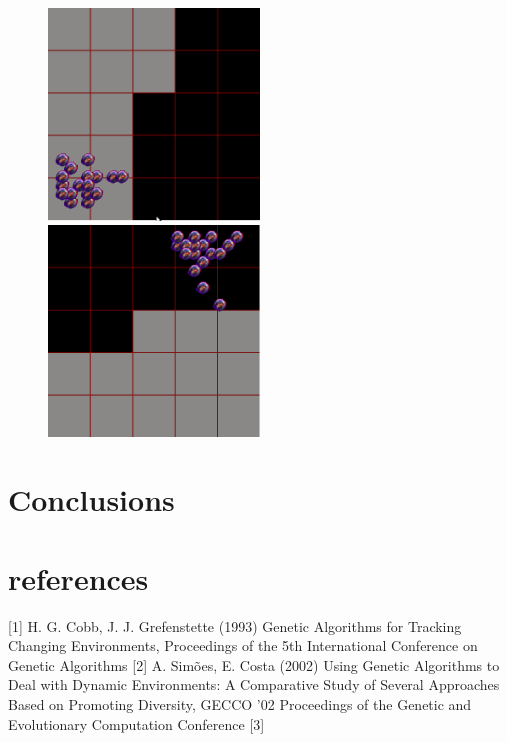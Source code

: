 \documentclass[a4paper,12pt]{article}
\begin{document}
\begin{figure}
  \caption{}
  \centering
    \includegraphics[width=0.5\textwidth]{BottomLeft.png}
    \includegraphics[width=0.5\textwidth]{TopRight.png}
\end{figure}


\section{Conclusions}

\section{references}
[1] H. G. Cobb, J. J. Grefenstette (1993) Genetic Algorithms for Tracking Changing Environments, Proceedings of the 5th International Conference on Genetic Algorithms
[2] A. Simões, E. Costa (2002) Using Genetic Algorithms to Deal with Dynamic Environments: A Comparative Study of Several Approaches Based on Promoting Diversity, GECCO '02 Proceedings of the Genetic and Evolutionary Computation Conference
[3]
\end{document}
